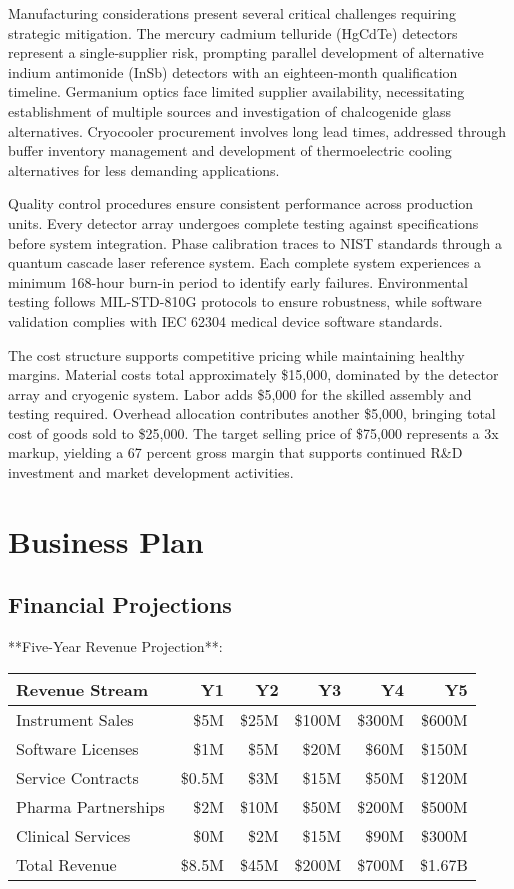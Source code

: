 \documentclass[12pt,a4paper]{report}
\begin{document}
Manufacturing considerations present several critical challenges requiring strategic mitigation. The mercury cadmium telluride (HgCdTe) detectors represent a single-supplier risk, prompting parallel development of alternative indium antimonide (InSb) detectors with an eighteen-month qualification timeline. Germanium optics face limited supplier availability, necessitating establishment of multiple sources and investigation of chalcogenide glass alternatives. Cryocooler procurement involves long lead times, addressed through buffer inventory management and development of thermoelectric cooling alternatives for less demanding applications.

Quality control procedures ensure consistent performance across production units. Every detector array undergoes complete testing against specifications before system integration. Phase calibration traces to NIST standards through a quantum cascade laser reference system. Each complete system experiences a minimum 168-hour burn-in period to identify early failures. Environmental testing follows MIL-STD-810G protocols to ensure robustness, while software validation complies with IEC 62304 medical device software standards.

The cost structure supports competitive pricing while maintaining healthy margins. Material costs total approximately \$15,000, dominated by the detector array and cryogenic system. Labor adds \$5,000 for the skilled assembly and testing required. Overhead allocation contributes another \$5,000, bringing total cost of goods sold to \$25,000. The target selling price of \$75,000 represents a 3x markup, yielding a 67 percent gross margin that supports continued R&D investment and market development activities.

\chapter{Business Plan}

\section{Financial Projections}

**Five-Year Revenue Projection**:

\begin{center}
\begin{tabular}{|l|r|r|r|r|r|}
\hline
Revenue Stream & Y1 & Y2 & Y3 & Y4 & Y5 \\
\hline
Instrument Sales & \$5M & \$25M & \$100M & \$300M & \$600M \\
Software Licenses & \$1M & \$5M & \$20M & \$60M & \$150M \\
Service Contracts & \$0.5M & \$3M & \$15M & \$50M & \$120M \\
Pharma Partnerships & \$2M & \$10M & \$50M & \$200M & \$500M \\
Clinical Services & \$0M & \$2M & \$15M & \$90M & \$300M \\
\hline
Total Revenue & \$8.5M & \$45M & \$200M & \$700M & \$1.67B \\
\hline
\end{tabular}
\end{center}
\end{document}
